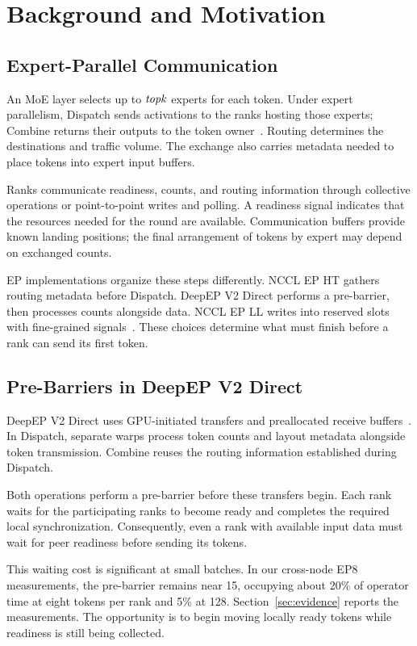 \section{Background and Motivation}
\label{sec:background}

\subsection{Expert-Parallel Communication}
\label{sec:epbackground}
An MoE layer selects up to $\mathit{topk}$ experts for each token. Under expert parallelism, Dispatch sends activations to the ranks hosting those experts; Combine returns their outputs to the token owner~\cite{deepep,ncclep}. Routing determines the destinations and traffic volume. The exchange also carries metadata needed to place tokens into expert input buffers.

Ranks communicate readiness, counts, and routing information through collective operations or point-to-point writes and polling. A readiness signal indicates that the resources needed for the round are available. Communication buffers provide known landing positions; the final arrangement of tokens by expert may depend on exchanged counts.

EP implementations organize these steps differently. NCCL EP HT gathers routing metadata before Dispatch. DeepEP V2 Direct performs a pre-barrier, then processes counts alongside data. NCCL EP LL writes into reserved slots with fine-grained signals~\cite{ncclhtcode,deepepcode,ncclllcode}. These choices determine what must finish before a rank can send its first token.

\subsection{Pre-Barriers in DeepEP V2 Direct}
\label{sec:epsynchronization}
DeepEP V2 Direct uses GPU-initiated transfers and preallocated receive buffers~\cite{deepepcode}. In Dispatch, separate warps process token counts and layout metadata alongside token transmission. Combine reuses the routing information established during Dispatch.

Both operations perform a pre-barrier before these transfers begin. Each rank waits for the participating ranks to become ready and completes the required local synchronization. Consequently, even a rank with available input data must wait for peer readiness before sending its tokens.

This waiting cost is significant at small batches. In our cross-node EP8 measurements, the pre-barrier remains near 15\us{}, occupying about 20\% of operator time at eight tokens per rank and 5\% at 128. Section~\ref{sec:evidence} reports the measurements. The opportunity is to begin moving locally ready tokens while readiness is still being collected.

